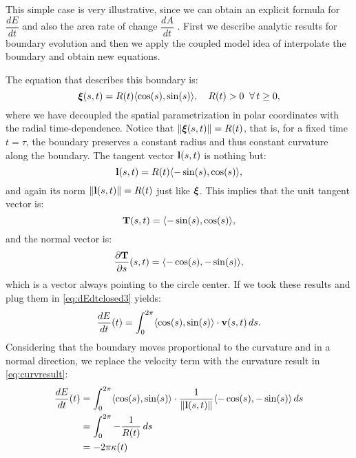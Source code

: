 This simple case is very illustrative, since we can obtain an explicit formula for $\dfrac{dE}{dt}$ and also the area rate of change $\dfrac{dA}{dt}$ . First we describe analytic results for boundary evolution and then we apply the coupled model idea of interpolate the boundary and obtain new equations.

The equation that describes this boundary is:
\begin{equation}
    \bm{\xi}(s,t) = R(t)\langle \cos(s), \sin(s) \rangle,\quad R(t) > 0 \;\;\forall\,t \geq 0,
    \label{eq:circle}
\end{equation}
where we have decoupled the spatial parametrization in polar coordinates with the radial time-dependence. Notice that $\left\lVert\bm{\xi}(s,t)\right\rVert = R(t)$, that is, for a fixed time $t=\tau$, the boundary preserves a constant radius and thus constant curvature along the boundary. The tangent vector $\mathbf{l}(s,t)$ is nothing but:
\begin{equation*}
    \mathbf{l}(s,t) = R(t)\langle -\sin(s), \cos(s) \rangle,
\end{equation*}
and again its norm $\left\lVert\mathbf{l}(s,t)\right\rVert = R(t)$ just like $\bm{\xi}$. This implies that the unit tangent vector is:
\begin{equation*}
\mathbf{T}(s,t) = \langle -\sin(s), \cos(s) \rangle,
\end{equation*}
and the normal vector is:
\begin{equation*}
    \dfrac{\partial \mathbf{T}}{\partial s}(s,t) = \langle -\cos(s), -\sin(s) \rangle,
\end{equation*}
which is a vector always pointing to the circle center. If we took these results and plug them in \eqref{eq:dEdtclosed3} yields:
\begin{equation*}
    \dfrac{dE}{dt}(t) = \int_0^{2\pi}  \langle \cos(s), \sin(s) \rangle \cdot \mathbf{v}(s,t)\, ds.
\end{equation*}
Considering that the boundary moves proportional to the curvature and in a normal direction, we replace the velocity term with the curvature result in \eqref{eq:curvresult}:
\begin{align}
    \dfrac{dE}{dt}(t) &= \int_0^{2\pi}  \langle \cos(s), \sin(s) \rangle \cdot \frac{1}{\left\lVert\mathbf{l}(s,t)\right\rVert} \langle -\cos(s), -\sin(s) \rangle\, ds \nonumber\\
    &= \int_0^{2\pi} -\frac{1}{R(t)} \,ds \nonumber\\
    &= -2\pi \kappa(t) \label{eq:dEdtcircle}
\end{align}

